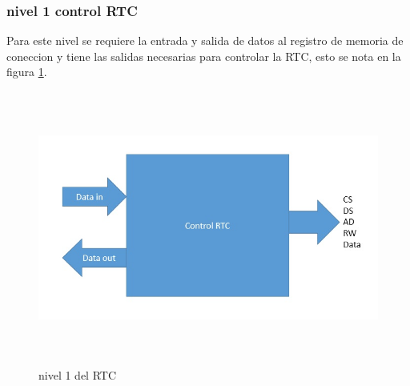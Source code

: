 \documentclass[12pt,a4paper]{article}
\begin{document}
\subsubsection{nivel 1 control RTC}
Para este nivel se requiere la entrada y salida de datos al registro de memoria de coneccion y tiene las salidas necesarias para controlar la RTC, esto se nota en la figura \ref{fig:nivel1RTC}.\\[2ex]
\begin{figure}[htbp]
	\centering
	\includegraphics[height=9cm, width=16cm]{img/nivel1_RTC.jpg}
	\caption[3erNivel]{nivel 1 del RTC}
	\label{fig:nivel1RTC}
\end{figure}
\end{document}
